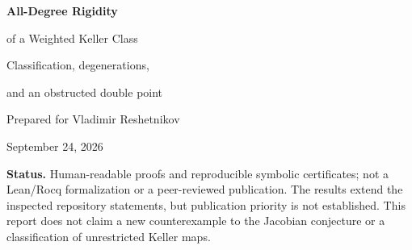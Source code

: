 \documentclass[11pt,a4paper]{article}
\numberwithin{equation}{section}
\theoremstyle{definition}
\theoremstyle{remark}
\newcommand{\Q}{\mathbb{Q}}
\newcommand{\Spec}{\operatorname{Spec}}
\newcommand{\eps}{\varepsilon}
\newcommand{\repo}{\texttt{ProveIt}}
\begin{document}
\begin{titlepage}
\thispagestyle{empty}
\par
\vspace{1.7cm}
{\color{inkblue}\Huge\bfseries All-Degree Rigidity\par
\vspace{0.2cm}of a Weighted Keller Class\par}
\vspace{0.65cm}
{\Large Classification, degenerations,\par and an obstructed double point\par}
\vspace{1.1cm}
{\large Prepared for Vladimir Reshetnikov}\par
\medskip
September 24, 2026\par
\vspace{0.9cm}
\begin{abstract}
We classify, without any bound on ordinary degree, a class of polynomial
Keller maps in three variables naturally singled out by the Jacobian project
in the \repo\ repository. The source weights are $(-1,1,2)$ and the target
weights are $(2,1,-1)$. In invariant coordinates $t=xy$ and $v=x^2z$, we
assume that the first two numerators are affine in $v$ and that the third
numerator is affine in $(t,v)$. Every normalized map is either an explicitly
invertible tame map or a member of a two-parameter diagonal orbit of the
known Alp\"oge map. In the latter case its degree profile is forced to be
$(7,6,4)$ and its expanded support has exactly sixteen monomials.

The proof replaces a degree-bounded coefficient search by one-variable
polynomial rigidity. An equivariant source shear extends the classification
 to arbitrary polynomial dependence of $r$ on $t$ when its $v$-coefficient
 is constant, and gives the exact noninvertible degree spectrum
 $\{7,8,10,12,\ldots\}$. We also identify the reduced closure of the nonconstant
branch as an affine plane whose coordinate axes are precisely its
invertible members. Finally, for the normalized degree-seven coefficient
problem with third numerator $1+t+v$, we prove that the entire coefficient
scheme is a double point, $\Spec\Q[\eps]/(\eps^2)$. An explicit nonzero
infinitesimal deformation is obstructed at second order. All finite
identities and obstruction certificates are independently reproduced by an
included exact-arithmetic script.
\end{abstract}
\vfill
\noindent\small
\textbf{Status.} Human-readable proofs and reproducible symbolic certificates;
not a Lean/Rocq formalization or a peer-reviewed publication. The results
extend the inspected repository statements, but publication priority is not
established. This report does not claim a new counterexample to the Jacobian
conjecture or a classification of unrestricted Keller maps.
\end{titlepage}
\end{document}
